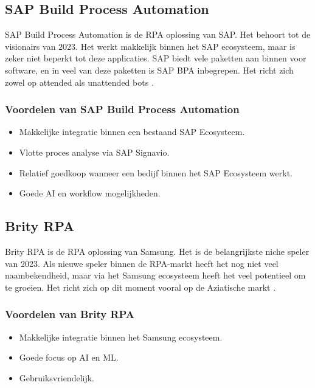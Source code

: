 \subsection{SAP Build Process Automation}
\label{subsec:sap-build-process-automation}

SAP Build Process Automation is de RPA oplossing van SAP. Het behoort tot de visionairs van 2023. Het werkt makkelijk binnen het SAP ecosysteem, maar is zeker niet beperkt tot deze applicaties. SAP biedt vele paketten aan binnen voor software, en in veel van deze paketten is SAP BPA inbegrepen. Het richt zich zowel op attended als unattended bots \autocite{GartnerSAPBPA2023}.

\subsubsection{Voordelen van SAP Build Process Automation}
\label{subsubsec:voordelen-van-sap-build-process-automation}

\begin{itemize}
    \item Makkelijke integratie binnen een bestaand SAP Ecosysteem.
    \item Vlotte proces analyse via SAP Signavio.
    \item Relatief goedkoop wanneer een bedijf binnen het SAP Ecosysteem werkt.
    \item Goede AI en workflow mogelijkheden.
\end{itemize}

\subsection{Brity RPA}
\label{subsec:brity-rpa}

Brity RPA is de RPA oplossing van Samsung. Het is de belangrijkste niche speler van 2023. Als nieuwe speler binnen de RPA-markt heeft het nog niet veel naambekendheid, maar via het Samsung ecosysteem heeft het veel potentieel om te groeien. Het richt zich op dit moment vooral op de Aziatische markt \autocite{GartnerSamsungSDSBrityRPA2024}.

\subsubsection{Voordelen van Brity RPA}

\begin{itemize}
    \item Makkelijke integratie binnen het Samsung ecosysteem.
    \item Goede focus op AI en ML.
    \item Gebruiksvriendelijk.
\end{itemize}

